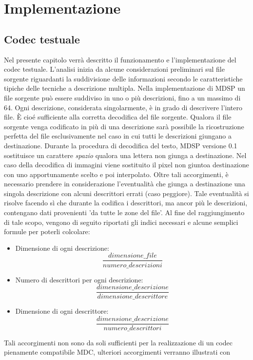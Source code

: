 \chapter{Implementazione}
\section{Codec testuale}
\label{cap:implementazione_codec}
Nel presente capitolo verrà descritto il funzionamento e l'implementazione
del codec testuale. L'analisi inizia da alcune considerazioni preliminari sul
file sorgente riguardanti la suddivisione delle informazioni secondo le
caratteristiche tipiche delle tecniche a descrizione multipla. Nella
implementazione di MDSP un file sorgente può essere suddiviso in uno o più
descrizioni, fino a un massimo di 64. Ogni descrizione, considerata
singolarmente, è in grado di descrivere l'intero file. \`E cioé sufficiente
alla corretta decodifica del file sorgente. Qualora il file sorgente venga
codificato in più di una descrizione sarà possibile la ricostruzione
perfetta del file esclusivamente nel caso in cui tutti le descrizioni giungano
a destinazione. Durante la procedura di decodifica del testo, MDSP versione 0.1
sostituisce un carattere \emph{spazio} qualora una lettera non giunga a
destinazione. Nel caso della decodifica di immagini viene sostituito il
pixel non giuntoa destinazione con uno apportunamente scelto e
poi interpolato. Oltre tali accorgimenti, è necessario prendere in
considerazione l'eventualità che giunga a destinazione una singola descrizione
con alcuni descrittori errati (caso peggiore). Tale eventualità si risolve
facendo sì che durante la codifica i descrittori, ma ancor più le descrizioni,
contengano dati provenienti 'da tutte le zone del file'. Al fine del
raggiungimento di tale scopo, vengono di seguito riportati gli indici necessari
e alcune semplici formule per poterli colcolare:
\begin{itemize}
 \item Dimensione di ogni descrizione: $$\frac{dimensione\_file}{numero\_descrizioni}$$
 \item Numero di descrittori per ogni descrizione: $$\frac{dimensione\_descrizione}{dimensione\_descrittore}$$
 \item Dimensione di ogni descrittore: $$\frac{dimensione\_descrizione}{numero\_descrittori}$$
\end{itemize}
Tali accorgimenti non sono da soli sufficienti per la realizzazione di un codec
pienamente compatibile MDC, ulteriori accorgimenti verranno illustrati con
